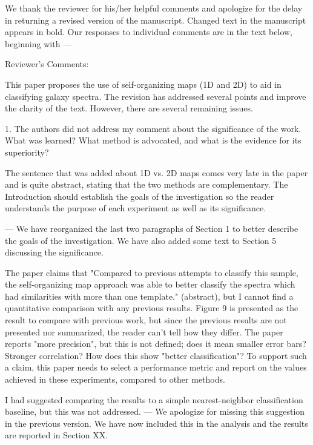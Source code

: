 We thank the reviewer for his/her helpful comments and apologize for the delay in returning a revised version of the manuscript. Changed text in the manuscript appears in bold. Our responses to individual comments are in the text below, beginning with ---



Reviewer's Comments:

This paper proposes the use of self-organizing maps (1D and 2D) to aid in classifying galaxy spectra.  The revision has addressed several points and improve the clarity of the text.  However, there are several remaining issues.

1. The authors did not address my comment about the significance of the work.  What was learned?  What method is advocated, and what is the evidence for its superiority?

The sentence that was added about 1D vs. 2D maps comes very late in the paper and is quite abstract, stating that the two methods are complementary.  The Introduction should establish the goals of the investigation so the reader understands the purpose of each experiment as well as its significance.

--- We have reorganized the last two paragraphs of Section 1 to better describe the goals of the investigation. 
We have also added some text to Section 5 discussing the significance. 


The paper claims that "Compared to previous attempts to classify this sample, the self-organizing map approach was able to better classify the spectra which had similarities with more than one template." (abstract), but I cannot find a quantitative comparison with any previous results.  Figure 9 is presented as the result to compare with previous work, but since the previous results are not presented nor summarized, the reader can't tell how they differ.  The paper reports "more precision", but this is not defined; does it mean smaller error bars?  Stronger correlation?  How does this show "better classification"?  To support such a claim, this paper needs to select a performance metric and report on the values achieved in these experiments, compared to other methods.

I had suggested comparing the results to a simple nearest-neighbor classification baseline, but this was not addressed.
--- We apologize for missing this suggestion in the previous version. We have now included this in the analysis and the results are reported in Section XX.

